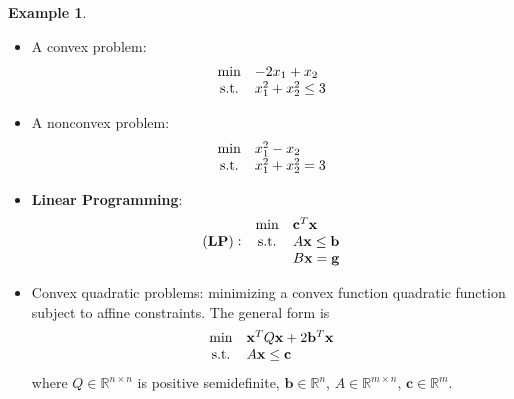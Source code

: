 \documentclass[12pt]{report}
\theoremstyle{definition}
\begin{document}
\newtheorem{CVX example}[theorem]{Example}
\begin{CVX example}
    \;

    \begin{itemize}
        \item A convex problem:
            \begin{equation*}
                \begin{array}{c @{\quad} l}
                    \min & -2x_1+x_2 \\
                    \text{s.t.} & x_1^2+x_2^2\le 3
                \end{array} 
            \end{equation*} 
        \item A nonconvex problem:
            \begin{equation*}
                \begin{array}{c @{\quad} l}
                    \min & x_1^2-x_2 \\
                    \text{s.t.} & x_1^2+x_2^2=3
                \end{array} 
            \end{equation*} 
        \item \textbf{Linear Programming}:
            \begin{equation*}
                \begin{array}{c @{\quad} c @{\quad} l}
                    & \min & \mathbf{c}^T\mathbf{x} \\
                    (\text{\textbf{LP}}): & \text{s.t.} & A\mathbf{x}\le\mathbf{b} \\
                                          & & B\mathbf{x}=\mathbf{g}
                \end{array} 
            \end{equation*} 
            
        \item Convex quadratic problems: minimizing a convex function quadratic
            function subject to affine constraints. The general form is
            \begin{equation*}
                \begin{array}{c @{\quad} l}
                    \min & \mathbf{x}^TQ\mathbf{x}+2\mathbf{b}^T\mathbf{x} \\
                    \text{s.t.} & A\mathbf{x}\le \mathbf{c}
                \end{array} 
            \end{equation*} 
            where $Q\in\mathbb{R}^{n\times n}$ is positive semidefinite,
            $\mathbf{b}\in\mathbb{R}^{n}$, $A\in\mathbb{R}^{m\times n}$,
            $\mathbf{c}\in\mathbb{R}^{m}$.
    \end{itemize} 
\end{CVX example}
\end{document}
